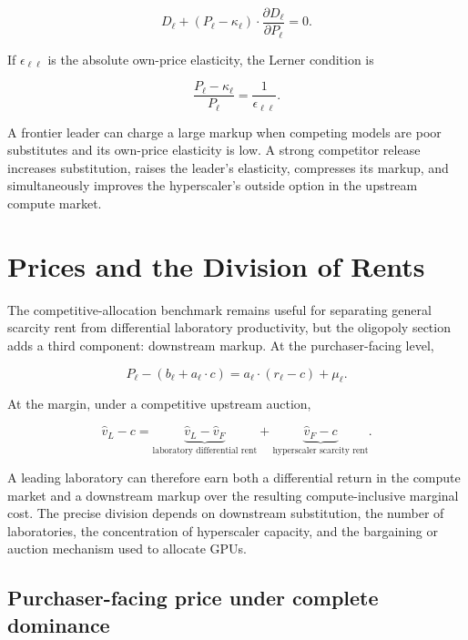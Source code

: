 \documentclass[11pt]{article}
\begin{document}
\begin{equation}D_\ell+\left(P_\ell-\kappa_\ell\right)\cdot\frac{\partial D_\ell}{\partial P_\ell}=0.\end{equation}

If $\epsilon_{\ell\ell}$ is the absolute own-price elasticity, the Lerner condition is

\begin{equation}\frac{P_\ell-\kappa_\ell}{P_\ell}=\frac{1}{\epsilon_{\ell\ell}}.\end{equation}

A frontier leader can charge a large markup when competing models are poor substitutes and its own-price elasticity is low. A strong competitor release increases substitution, raises the leader's elasticity, compresses its markup, and simultaneously improves the hyperscaler's outside option in the upstream compute market.

\section{Prices and the Division of Rents}
\label{sec:prices-rents}

The competitive-allocation benchmark remains useful for separating general scarcity rent from differential laboratory productivity, but the oligopoly section adds a third component: downstream markup. At the purchaser-facing level,

\begin{equation}P_\ell-\left(b_\ell+a_\ell\cdot c\right)=a_\ell\cdot(r_\ell-c)+\mu_\ell.\end{equation}

At the margin, under a competitive upstream auction,

\begin{equation}\widehat v_L-c=\underbrace{\widehat v_L-\widehat v_F}_{\text{laboratory differential rent}}+\underbrace{\widehat v_F-c}_{\text{hyperscaler scarcity rent}}.\end{equation}

A leading laboratory can therefore earn both a differential return in the compute market and a downstream markup over the resulting compute-inclusive marginal cost. The precise division depends on downstream substitution, the number of laboratories, the concentration of hyperscaler capacity, and the bargaining or auction mechanism used to allocate GPUs.

\subsection{Purchaser-facing price under complete dominance}
\end{document}
